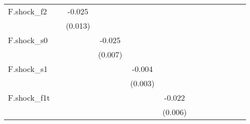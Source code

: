 {\begin{tabular}{l*{12}{c}}
\addlinespace
F.shock\_f2  &                     &      -0.025\sym{*}  &                     &                     &                     &                     &                     &                     &                     &                     &                     &                     \\
            &                     &     (0.013)         &                     &                     &                     &                     &                     &                     &                     &                     &                     &                     \\
\addlinespace
F.shock\_s0  &                     &                     &      -0.025\sym{***}&                     &                     &                     &                     &                     &                     &                     &                     &                     \\
            &                     &                     &     (0.007)         &                     &                     &                     &                     &                     &                     &                     &                     &                     \\
\addlinespace
F.shock\_s1  &                     &                     &                     &      -0.004         &                     &                     &                     &                     &                     &                     &                     &                     \\
            &                     &                     &                     &     (0.003)         &                     &                     &                     &                     &                     &                     &                     &                     \\
\addlinespace
F.shock\_f1t &                     &                     &                     &                     &      -0.022\sym{***}&                     &                     &                     &                     &                     &                     &                     \\
            &                     &                     &                     &                     &     (0.006)         &                     &                     &                     &                     &                     &                     &                     \\

\end{tabular}}
